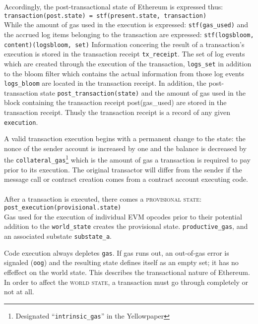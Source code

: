 \documentclass[10pt,a4paper,leqno,bibliography=totoc]{scrartcl}
\newenvironment{alphafootnotes}
{\par\edef\savedfootnotenumber{\number\value{footnote}}
\renewcommand{\thefootnote}{\alph{footnote}}
\setcounter{footnote}{0}}
{\par\setcounter{footnote}{\savedfootnotenumber}}
\begin{document}
\begin{alphafootnotes}
\begin{multicols*}{2}
				Accordingly, the post-transactional state of Ethereum is expressed thus: 
				\\
				\texttt{transaction(post.state) = stf(present.state, transaction)}  
				\\
				While the amount of gas used in the execution is expressed: \texttt{stf(gas\_used)} and the accrued log items belonging to the transaction are expressed: \texttt{stf(logsbloom, content)(logsbloom, set)} Information concering the result of a transaction's execution is stored in the transaction receipt \texttt{tx\_receipt}. The set of log events which are created through the execution of the transaction, \texttt{logs\_set} in addition to the bloom filter which contains the actual information from those log events \texttt{logs\_bloom} are located in the transaction receipt. In addition, the post-transaction state \texttt{post\_transaction(state)} and the amount of gas used in the block containing the transaction receipt post(gas\_used) are stored in the transaction receipt. Thusly the transaction receipt is a record of any given \texttt{execution}. \par

																			A valid transaction execution begins with a permanent change to the state: the nonce of the sender account is increased by one and the balance is decreased by the \texttt{collateral\_gas}\footnote{Designated ``\texttt{intrinsic\_gas}'' in the Yellowpaper} which is the amount of gas a transaction is required to pay prior to its execution. The original transactor will differ from the sender if the message call or contract creation comes from a contract account executing code. 
\paragraph{}After a transaction is executed, there comes a \textsc{provisional state}:
			\\
			\texttt{post\_execution(provisional.state)}
			\\
			Gas used for the execution of individual EVM opcodes prior to their potential addition to the \texttt{world\_state} creates the provisional state. \texttt{productive\_gas}, and an associated substate \texttt{substate\_a}. 
\par
																			Code execution always depletes \texttt{gas}. If gas runs out, an out-of-gas error is signaled (\texttt{oog}) and the resulting state defines itself as an empty set; it has no effeffect on the world state. This describes the transactional nature of Ethereum. In order to affect the \textsc{world state}, a transaction must go through completely or not at all. 



\end{multicols*}
\end{alphafootnotes}
\end{document}
